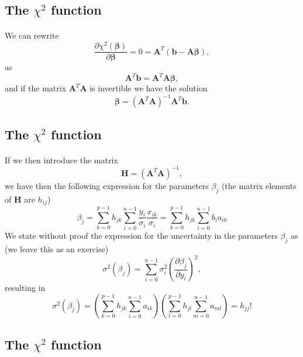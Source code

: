 \documentclass[%
oneside,                 %
final,                   %
10pt]{article}
\begin{document}
\subsection{The $\chi^2$ function}

\paragraph{}

We can rewrite
\[
\frac{\partial \chi^2(\bm{\beta})}{\partial \bm{\beta}} = 0 = \bm{A}^T\left( \bm{b}-\bm{A}\bm{\beta}\right),  
\]
as
\[
\bm{A}^T\bm{b} = \bm{A}^T\bm{A}\bm{\beta},  
\]
and if the matrix $\bm{A}^T\bm{A}$ is invertible we have the solution
\[
\bm{\beta} =\left(\bm{A}^T\bm{A}\right)^{-1}\bm{A}^T\bm{b}.
\]



\subsection{The $\chi^2$ function}

\paragraph{}

If we then introduce the matrix
\[
\bm{H} =  \left(\bm{A}^T\bm{A}\right)^{-1},
\]
we have then the following expression for the parameters $\beta_j$ (the matrix elements of $\bm{H}$ are $h_{ij}$)
\[
\beta_j = \sum_{k=0}^{p-1}h_{jk}\sum_{i=0}^{n-1}\frac{y_i}{\sigma_i}\frac{x_{ik}}{\sigma_i} = \sum_{k=0}^{p-1}h_{jk}\sum_{i=0}^{n-1}b_ia_{ik}
\]
We state without proof the expression for the uncertainty  in the parameters $\beta_j$ as (we leave this as an exercise)
\[
\sigma^2(\beta_j) = \sum_{i=0}^{n-1}\sigma_i^2\left( \frac{\partial \beta_j}{\partial y_i}\right)^2, 
\]
resulting in 
\[
\sigma^2(\beta_j) = \left(\sum_{k=0}^{p-1}h_{jk}\sum_{i=0}^{n-1}a_{ik}\right)\left(\sum_{l=0}^{p-1}h_{jl}\sum_{m=0}^{n-1}a_{ml}\right) = h_{jj}!
\]



\subsection{The $\chi^2$ function}

\end{document}
